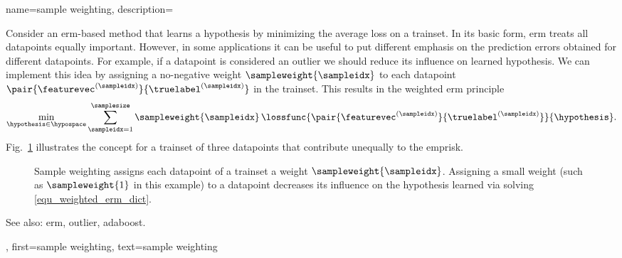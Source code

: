 {name={sample weighting}, 
	description={Consider an \gls{erm}-based method that 
	learns a \gls{hypothesis} by minimizing the average \gls{loss} on a \gls{trainset}. 
	In its basic form, \gls{erm} treats all \glspl{datapoint} equally important. 
	However, in some applications it can be useful to put different emphasis on the 
	\gls{prediction} errors obtained for different \glspl{datapoint}. For example, 
	if a \gls{datapoint} is considered an \gls{outlier} we should reduce its influence 
	on learned \gls{hypothesis}. 
	We can implement this idea by assigning a no-negative weight 
	$\sampleweight{\sampleidx}$ to each \gls{datapoint} 
	$\pair{\featurevec^{(\sampleidx)}}{\truelabel^{(\sampleidx)}}$ in the \gls{trainset}. 
    This results in the weighted \gls{erm} principle 
	\begin{equation}
		\label{equ_weighted_erm_dict}
		\min_{\hypothesis \in \hypospace} \sum_{\sampleidx=1}^{\samplesize} 
			  \sampleweight{\sampleidx} \, \lossfunc{\pair{\featurevec^{(\sampleidx)}}{\truelabel^{(\sampleidx)}}}{\hypothesis}. 
	\end{equation}
	Fig.~\ref{fig_sampleweighting_dict} illustrates the concept for a 
	\gls{trainset} of three \glspl{datapoint} that contribute unequally to the 
	\gls{emprisk}.
    \begin{figure}[H]
    \begin{center}
      \caption{Sample weighting assigns each \gls{datapoint} of a \gls{trainset} 
	  a weight $\sampleweight{\sampleidx}$. Assigning a small weight 
	  (such as $\sampleweight{1}$ in this example) to a 
	  \gls{datapoint} decreases its influence on the \gls{hypothesis} 
	  learned via solving \eqref{equ_weighted_erm_dict}.}
      \label{fig_sampleweighting_dict}
    \end{center}
    \end{figure}
		See also: \gls{erm}, \gls{outlier}, \gls{adaboost}.},
	first={sample weighting}, 
	text={sample weighting}
}


